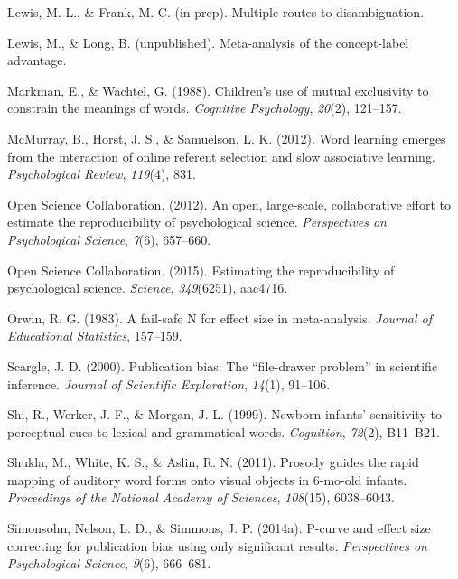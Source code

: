 \documentclass[english,floatsintext,man]{apa6}
\begin{document}
\hypertarget{ref-lfprep}{}
Lewis, M. L., \& Frank, M. C. (in prep). Multiple routes to
disambiguation.

\hypertarget{ref-lewisunpublished}{}
Lewis, M., \& Long, B. (unpublished). Meta-analysis of the concept-label
advantage.

\hypertarget{ref-markman1988}{}
Markman, E., \& Wachtel, G. (1988). Children's use of mutual exclusivity
to constrain the meanings of words. \emph{Cognitive Psychology},
\emph{20}(2), 121--157.

\hypertarget{ref-mcmurray2012word}{}
McMurray, B., Horst, J. S., \& Samuelson, L. K. (2012). Word learning
emerges from the interaction of online referent selection and slow
associative learning. \emph{Psychological Review}, \emph{119}(4), 831.

\hypertarget{ref-open2012open}{}
Open Science Collaboration. (2012). An open, large-scale, collaborative
effort to estimate the reproducibility of psychological science.
\emph{Perspectives on Psychological Science}, \emph{7}(6), 657--660.

\hypertarget{ref-open2015estimating}{}
Open Science Collaboration. (2015). Estimating the reproducibility of
psychological science. \emph{Science}, \emph{349}(6251), aac4716.

\hypertarget{ref-orwin1983fail}{}
Orwin, R. G. (1983). A fail-safe N for effect size in meta-analysis.
\emph{Journal of Educational Statistics}, 157--159.

\hypertarget{ref-scargle1999publication}{}
Scargle, J. D. (2000). Publication bias: The ``file-drawer problem'' in
scientific inference. \emph{Journal of Scientific Exploration},
\emph{14}(1), 91--106.

\hypertarget{ref-shi1999newborn}{}
Shi, R., Werker, J. F., \& Morgan, J. L. (1999). Newborn infants'
sensitivity to perceptual cues to lexical and grammatical words.
\emph{Cognition}, \emph{72}(2), B11--B21.

\hypertarget{ref-shukla2011prosody}{}
Shukla, M., White, K. S., \& Aslin, R. N. (2011). Prosody guides the
rapid mapping of auditory word forms onto visual objects in 6-mo-old
infants. \emph{Proceedings of the National Academy of Sciences},
\emph{108}(15), 6038--6043.

\hypertarget{ref-simonsohn2014power}{}
Simonsohn, Nelson, L. D., \& Simmons, J. P. (2014a). P-curve and effect
size correcting for publication bias using only significant results.
\emph{Perspectives on Psychological Science}, \emph{9}(6), 666--681.
\end{document}
